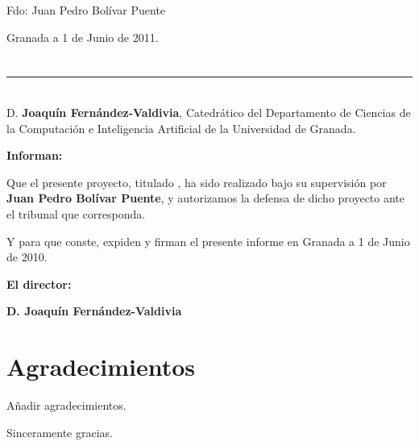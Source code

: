 \vspace{6cm}
\noindent Fdo: Juan Pedro Bolívar Puente

\vspace{2cm}

\begin{flushright}
Granada a 1 de Junio de 2011.
\end{flushright}


\chapter*{}
\thispagestyle{empty}

\noindent\rule[-1ex]{\textwidth}{2pt}\\[4.5ex]

D. \textbf{Joaquín Fernández-Valdivia}, Catedrático del Departamento
de Ciencias de la Computación e Inteligencia Artificial de la
Universidad de Granada.  \vspace{0.5cm}


\textbf{Informan:}
\vspace{0.5cm}

Que el presente proyecto, titulado \textit{\textbf{\myTitle}}, ha sido
realizado bajo su supervisión por \textbf{Juan Pedro Bolívar Puente}, y
autorizamos la defensa de dicho proyecto ante el tribunal que
corresponda.
\vspace{0.5cm}

Y para que conste, expiden y firman el presente informe en Granada a 1
de Junio de 2010.
\vspace{1cm}

\textbf{El director:}
\vspace{5cm}

\noindent 
\textbf{D. Joaquín Fernández-Valdivia}%

\chapter*{Agradecimientos}
\thispagestyle{empty}
\vspace{1cm}
\begin{todo}
 Añadir agradecimientos.
\end{todo}


\vspace{3cm}
\noindent Sinceramente gracias.

